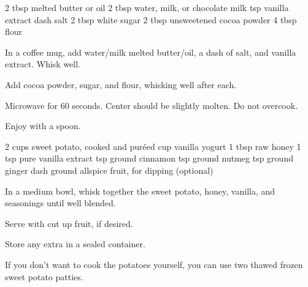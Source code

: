 \begin{ingreds}
  2 tbsp melted butter or oil
  2 tbsp water, milk, or chocolate milk
   tsp vanilla extract
  dash salt
  2 tbsp white sugar
  2 tbsp unsweetened cocoa powder
  4 tbsp flour
\end{ingreds}
\begin{method}
  In a coffee mug, add water/milk
  melted butter/oil, a dash of salt,
  and vanilla extract. Whisk well.

  Add cocoa powder, sugar, and flour,
  whisking well after each.

  Microwave for 60 seconds.
  Center should be slightly molten.
  Do not overcook.

  Enjoy with a spoon.
\end{method}

\freezerfriendly
\vegetarian%
\begin{ingreds}
  2 cups sweet potato, cooked and pur\'eed
   cup vanilla yogurt
  1 tbsp raw honey
  1 tsp pure vanilla extract
   tsp ground cinnamon
   tsp ground nutmeg
   tsp ground ginger
  dash ground allspice
  fruit, for dipping (optional)
\end{ingreds}
\begin{method}
  In a medium bowl, whisk together
  the sweet potato, honey, vanilla,
  and seasonings until well blended.

  Serve with cut up fruit, if desired.

  Store any extra in a sealed container.
\end{method}
\begin{tips}
  If you don't want to cook the potatoes yourself,
  you can use two thawed frozen sweet potato patties.
\end{tips}
